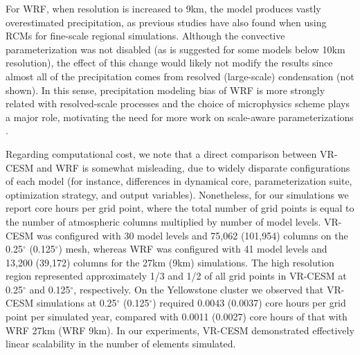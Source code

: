 \documentclass[ms]{agutex}   %
\begin{document}
\begin{article}
For WRF, when resolution is increased to 9km, the model produces vastly overestimated precipitation, as previous studies have also found when using RCMs for fine-scale regional simulations. Although the convective parameterization was not disabled (as is suggested for some models below 10km resolution), the effect of this change would likely not modify the results since almost all of the precipitation comes from resolved (large-scale) condensation (not shown). In this sense, precipitation modeling bias of WRF is more strongly related with resolved-scale processes and the choice of microphysics scheme plays a major role, motivating the need for more work on scale-aware parameterizations \citep{o2013observed}. 

Regarding computational cost, we note that a direct comparison between VR-CESM and WRF is somewhat misleading, due to widely disparate configurations of each model (for instance, differences in dynamical core, parameterization suite, optimization strategy, and output variables). Nonetheless, for our simulations we report core hours per grid point, where the total number of grid points is equal to the number of atmospheric columns multiplied by number of model levels.  VR-CESM was configured with 30 model levels and 75,062 (101,954) columns on the 0.25$^\circ$ (0.125$^\circ$) mesh, whereas WRF was configured with 41 model levels and 13,200 (39,172) columns for the 27km (9km) simulations.  The high resolution region represented approximately 1/3 and 1/2 of all grid points in VR-CESM at 0.25$^\circ$ and 0.125$^\circ$, respectively.  On the Yellowstone cluster we observed that VR-CESM simulations at 0.25$^\circ$ (0.125$^\circ$) required 0.0043 (0.0037) core hours per grid point per simulated year, compared with 0.0011 (0.0027) core hours of that with WRF 27km (WRF 9km). In our experiments, VR-CESM demonstrated effectively linear scalability in the number of elements simulated.



\end{article}
\end{document}
